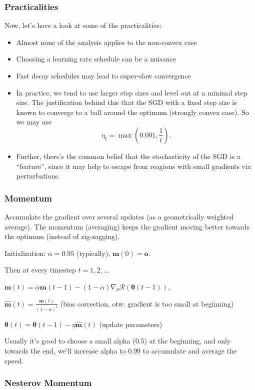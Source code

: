 \documentclass[a2paper,8pt]{extarticle}
\newcommand{\cR}{\mathcal{R}}
\renewcommand{\vec}[1]{\mathbf{#1}}
\newcommand{\vm}{\vec{m}}
\newcommand{\vo}{\vec{o}}
\newcommand{\vhm}{\widehat{\vec{m}}}
\newcommand{\vtheta}{\boldsymbol{\theta}}
\begin{document}
\begin{landscape}
\begin{multicols*}{7}
\subsubsection{Practicalities}

Now, let's have a look at some of the practicalities:
\begin{itemize}
  \item Almost none of the analysis applies to the non-convex case
  \item Choosing a learning rate schedule can be a nuisance
  \item Fast decay schedules may lead to super-slow convergence
  \item In practice, we tend to use larger step sizes and level out at a minimal
  step size. The justification behind this that the SGD with a fixed step size
  is known to converge to a ball around the optimum (strongly convex case). So
  we may use
  \[
  \eta_t=\max(0.001,\frac{1}{t}).
  \]
  \item Further, there's the common belief that the stochasticity of the SGD is
  a ``feature'', since it may help to escape from reagions with small gradients
  via perturbations.
\end{itemize}

\subsubsection{Momentum}

Accumulate the gradient over several updates (as a geometrically weighted
average). The momentum (averaging) keeps the gradient moving better towards the
optimum (instead of zig-zagging).

Initialization: $\alpha=0.95$ (typically), $\vm(0)=\vo$.

Then at every timestep $t=1,2,\ldots$

$
\vm(t)=\alpha \vm(t-1)-(1-\alpha)\nabla_\theta\cR(\vtheta(t-1)),
$

$
\vhm(t)=\frac{\vm(t)}{(1-\alpha)^t}
$ \quad(bias correction, otw. gradient is too small at beginning)

$
\vtheta(t)=\vtheta(t-1)-\eta\vhm(t)
$ \quad (update parameters)

Usually it's good to choose a small alpha (0.5) at the beginning, and only
towards the end, we'll increase alpha to 0.99 to accumulate and average the
speed.

\subsubsection{Nesterov Momentum}


\end{multicols*}
\end{landscape}
\end{document}
